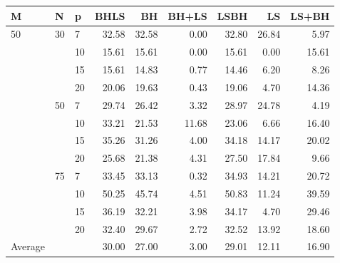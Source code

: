 \begin{center}
  \begin{tabular}{|l|l|l|rrrrrr|}
    \hline
    M & N & p & BHLS & BH & BH+LS & LSBH & LS & LS+BH \\ \hline
    50 & 30 & 7 & 32.58 & 32.58 & 0.00 & 32.80 & 26.84 & 5.97 \\
    &  & 10 & 15.61 & 15.61 & 0.00 & 15.61 & 0.00 & 15.61 \\
    &  & 15 & 15.61 & 14.83 & 0.77 & 14.46 & 6.20 & 8.26 \\
    &  & 20 & 20.06 & 19.63 & 0.43 & 19.06 & 4.70 & 14.36 \\ \cline{2-9}
    & 50 & 7 & 29.74 & 26.42 & 3.32 & 28.97 & 24.78 & 4.19 \\
    &  & 10 & 33.21 & 21.53 & 11.68 & 23.06 & 6.66 & 16.40 \\
    &  & 15 & 35.26 & 31.26 & 4.00 & 34.18 & 14.17 & 20.02 \\
    &  & 20 & 25.68 & 21.38 & 4.31 & 27.50 & 17.84 & 9.66 \\ \cline{2-9}
    & 75 & 7 & 33.45 & 33.13 & 0.32 & 34.93 & 14.21 & 20.72 \\
    &  & 10 & 50.25 & 45.74 & 4.51 & 50.83 & 11.24 & 39.59 \\
    &  & 15 & 36.19 & 32.21 & 3.98 & 34.17 & 4.70 & 29.46 \\
    &  & 20 & 32.40 & 29.67 & 2.72 & 32.52 & 13.92 & 18.60 \\ \hline
    Average &  &  & 30.00 & 27.00 & 3.00 & 29.01 & 12.11 & 16.90 \\
    \hline
  \end{tabular}
\end{center}

